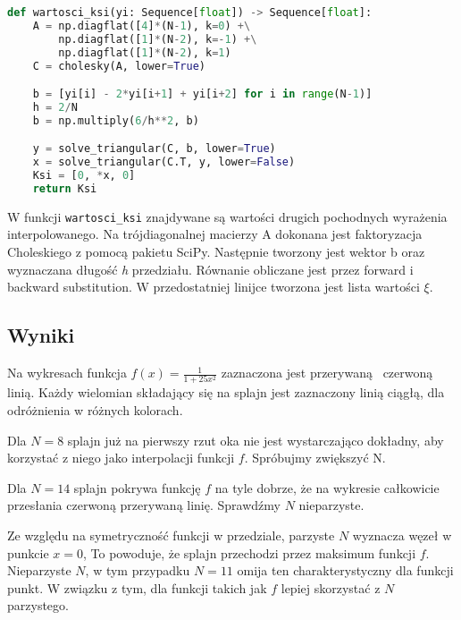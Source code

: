 \documentclass[a4paper,11pt]{article}
\begin{document}
\pagebreak

\begin{lstlisting}[caption={Obliczanie wartości \(\xi \)},language=Python]
def wartosci_ksi(yi: Sequence[float]) -> Sequence[float]:
    A = np.diagflat([4]*(N-1), k=0) +\
        np.diagflat([1]*(N-2), k=-1) +\
        np.diagflat([1]*(N-2), k=1)
    C = cholesky(A, lower=True)

    b = [yi[i] - 2*yi[i+1] + yi[i+2] for i in range(N-1)]
    h = 2/N
    b = np.multiply(6/h**2, b)

    y = solve_triangular(C, b, lower=True)
    x = solve_triangular(C.T, y, lower=False)
    Ksi = [0, *x, 0]
    return Ksi
\end{lstlisting}
W funkcji \lstinline{wartosci_ksi} znajdywane są wartości drugich pochodnych
wyrażenia interpolowanego. Na trójdiagonalnej macierzy A dokonana jest
faktoryzacja Choleskiego z pomocą pakietu SciPy. Następnie tworzony jest wektor
b oraz wyznaczana długość \textit{h} przedziału.
Równanie obliczane jest przez forward i backward substitution. 
W przedostatniej linijce tworzona jest lista wartości \(\xi \).

\subsection{Wyniki}

Na wykresach funkcja \(f(x) = \frac{1}{1+25x^2}\) zaznaczona jest przerywaną 
czerwoną linią. Każdy wielomian składający się na splajn jest zaznaczony linią
ciągłą, dla odróżnienia w różnych kolorach.

\begin{figure}[H]
    \begin{center}
                
    \end{center}
\end{figure}

Dla \(N=8\) splajn już na pierwszy rzut oka nie jest wystarczająco dokładny,
aby korzystać z niego jako interpolacji funkcji \(f\). Spróbujmy zwiększyć N.

\begin{figure}[H]
    \begin{center}
                
    \end{center}
\end{figure}

Dla \(N=14\) splajn pokrywa funkcję \(f\) na tyle dobrze, że na wykresie
całkowicie przesłania czerwoną przerywaną linię. Sprawdźmy \(N\) nieparzyste.

\begin{figure}[H]
    \begin{center}
                
    \end{center}
\end{figure}

Ze względu na symetryczność funkcji w przedziale, parzyste \(N\) wyznacza węzeł
w punkcie \(x=0\), To powoduje, że splajn przechodzi przez maksimum funkcji 
\(f\). Nieparzyste \(N\), w tym przypadku \(N=11\) omija ten charakterystyczny
dla funkcji punkt. W związku z tym, dla funkcji takich jak \(f\) lepiej
skorzystać z \(N\) parzystego.
\end{document}
